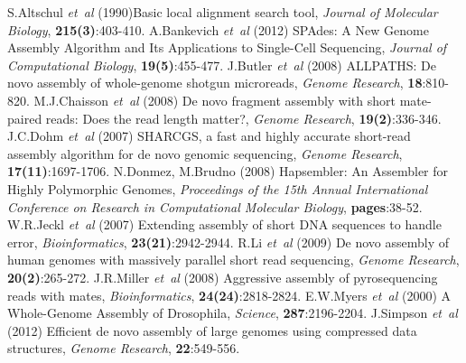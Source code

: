 \documentclass{bioinfo}
\begin{document}
%
%
%
%
%
%
%
%
%

\newpage
 
% 
%
\begin{thebibliography}{}
 S.Altschul {\it et~al} (1990)Basic local alignment search tool, \textit{Journal of Molecular Biology}, {\bf 215(3)}:403-410.
 A.Bankevich {\it et~al} (2012) SPAdes: A New Genome Assembly Algorithm and Its Applications to Single-Cell Sequencing, \textit{Journal of Computational Biology}, {\bf 19(5)}:455-477.
 J.Butler \textit{et~al} (2008) ALLPATHS: De novo assembly of whole-genome shotgun microreads, {\it Genome Research}, {\bf 18}:810-820.
 M.J.Chaisson \textit{et~al} (2008) De novo fragment assembly with short mate-paired reads: Does the read length matter?, \textit{Genome Research}, {\bf 19(2)}:336-346.
 J.C.Dohm \textit{et~al} (2007) SHARCGS, a fast and highly accurate short-read assembly algorithm for de novo genomic sequencing, \textit{Genome Research}, {\bf 17(11)}:1697-1706.
 N.Donmez, M.Brudno (2008) Hapsembler: An Assembler for Highly Polymorphic Genomes, \textit{Proceedings of the 15th Annual International Conference on Research in Computational Molecular Biology}, {\bf pages}:38-52.
 W.R.Jeckl \textit{et~al} (2007) Extending assembly of short DNA sequences to handle error, \textit{Bioinformatics}, {\bf 23(21)}:2942-2944.
 R.Li \textit{et~al} (2009) De novo assembly of human genomes with massively parallel short read sequencing, \textit{Genome Research}, {\bf 20(2)}:265-272.
 J.R.Miller \textit{et~al} (2008) Aggressive assembly of pyrosequencing reads with mates, \textit{Bioinformatics}, {\bf 24(24)}:2818-2824.
 E.W.Myers \textit{et~al} (2000) A Whole-Genome Assembly of Drosophila, \textit{Science}, {\bf 287}:2196-2204.
 J.Simpson \textit{et~al} (2012) Efficient de novo assembly of large genomes using compressed data structures, \textit{Genome Research}, {\bf 22}:549-556.

\end{thebibliography}
\end{document}
